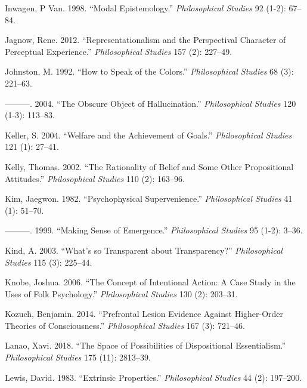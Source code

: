 \documentclass[
  10pt,
  letterpaper,
  DIV=11,
  numbers=noendperiod,
  twoside]{scrartcl}
\newlength{\cslhangindent}
\newenvironment{CSLReferences}[2] %
 {\begin{list}{}{%
  \setlength{\itemindent}{0pt}
  \setlength{\leftmargin}{0pt}
  \setlength{\parsep}{0pt}
  \ifodd #1
   \setlength{\leftmargin}{\cslhangindent}
   \setlength{\itemindent}{-1\cslhangindent}
  \fi
  \setlength{\itemsep}{#2\baselineskip}}}
 {\end{list}}
\begin{document}
\begin{CSLReferences}{1}{0}
Inwagen, P Van. 1998. {``Modal Epistemology.''} \emph{Philosophical
Studies} 92 (1-2): 67--84.

Jagnow, Rene. 2012. {``Representationalism and the Perspectival
Character of Perceptual Experience.''} \emph{Philosophical Studies} 157
(2): 227--49.

Johnston, M. 1992. {``How to Speak of the Colors.''} \emph{Philosophical
Studies} 68 (3): 221--63.

---------. 2004. {``The Obscure Object of Hallucination.''}
\emph{Philosophical Studies} 120 (1-3): 113--83.

Keller, S. 2004. {``Welfare and the Achievement of Goals.''}
\emph{Philosophical Studies} 121 (1): 27--41.

Kelly, Thomas. 2002. {``The Rationality of Belief and Some Other
Propositional Attitudes.''} \emph{Philosophical Studies} 110 (2):
163--96.

Kim, Jaegwon. 1982. {``Psychophysical Supervenience.''}
\emph{Philosophical Studies} 41 (1): 51--70.

---------. 1999. {``Making Sense of Emergence.''} \emph{Philosophical
Studies} 95 (1-2): 3--36.

Kind, A. 2003. {``What's so Transparent about Transparency?''}
\emph{Philosophical Studies} 115 (3): 225--44.

Knobe, Joshua. 2006. {``The Concept of Intentional Action: A Case Study
in the Uses of Folk Psychology.''} \emph{Philosophical Studies} 130 (2):
203--31.

Kozuch, Benjamin. 2014. {``Prefrontal Lesion Evidence Against
Higher-Order Theories of Consciousness.''} \emph{Philosophical Studies}
167 (3): 721--46.

Lanao, Xavi. 2018. {``The Space of Possibilities of Dispositional
Essentialism.''} \emph{Philosophical Studies} 175 (11): 2813--39.

Lewis, David. 1983. {``Extrinsic Properties.''} \emph{Philosophical
Studies} 44 (2): 197--200.


\end{CSLReferences}
\end{document}
